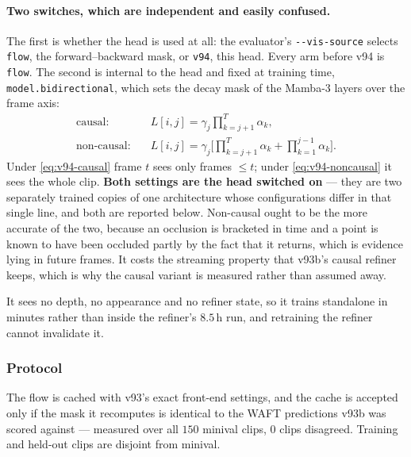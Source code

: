\documentclass[11pt,a4paper]{article}
\begin{document}
\paragraph{Two switches, which are independent and easily confused.}
The first is whether the head is used at all: the evaluator's \texttt{-{}-vis-source} selects
\texttt{flow}, the forward--backward mask, or \texttt{v94}, this head. Every arm before v94 is
\texttt{flow}. The second is internal to the head and fixed at training time, \texttt{model.bidirectional},
which sets the decay mask of the Mamba-3 layers over the frame axis:
\begin{align}
\text{causal:} \quad & L[i,j] = \gamma_j \textstyle\prod_{k=j+1}^{T} \alpha_k, \label{eq:v94-causal}\\
\text{non-causal:} \quad & L[i,j] = \gamma_j \big[\textstyle\prod_{k=j+1}^{T} \alpha_k + \prod_{k=1}^{j-1} \alpha_k\big].
\label{eq:v94-noncausal}
\end{align}
Under \eqref{eq:v94-causal} frame $t$ sees only frames $\le t$; under \eqref{eq:v94-noncausal} it
sees the whole clip. \textbf{Both settings are the head switched on} --- they are two separately
trained copies of one architecture whose configurations differ in that single line, and both are
reported below. Non-causal ought to be the more accurate of the two, because an occlusion is
bracketed in time and a point is known to have been occluded partly by the fact that it returns,
which is evidence lying in future frames. It costs the streaming property that v93b's causal
refiner keeps, which is why the causal variant is measured rather than assumed away.



It sees no depth, no appearance and no refiner state, so it trains standalone in minutes rather
than inside the refiner's $8.5$\,h run, and retraining the refiner cannot invalidate it.

\subsubsection{Protocol}
The flow is cached with v93's exact front-end settings, and the cache is accepted only if the
mask it recomputes is identical to the WAFT predictions v93b was scored against --- measured
over all $150$ minival clips, $0$ clips disagreed. Training and held-out clips are disjoint from
minival.
\end{document}
